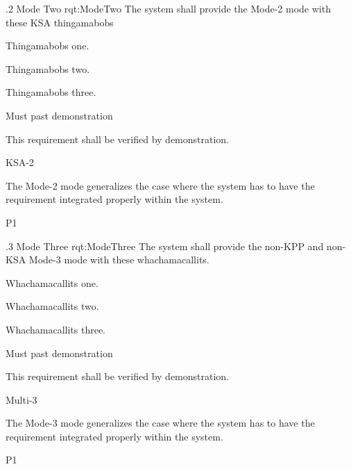 \MULTIRQMTVKSA
{\RqtNumberBase.2}
{Mode Two}
{rqt:ModeTwo}
{The system shall provide the Mode-2 mode with these KSA thingamabobs}
{
	\item Thingamabobs one.
	\item Thingamabobs two.
	\item Thingamabobs three.
}
{
	\item [Phase 1] Must past demonstration
}
{This requirement shall be verified by demonstration.}
{
	\item [\cite{ref__KNEAD_Manual}] KSA-2
}
{
	\item The Mode-2 mode generalizes the case where the system has to have the requirement integrated properly within the system.
}
{P1}


\MULTIRQMTV
{\RqtNumberBase.3}
{Mode Three}
{rqt:ModeThree}
{The system shall provide the non-KPP and non-KSA Mode-3 mode with these whachamacallits.}
{
	\item Whachamacallits one.
	\item Whachamacallits two.
	\item Whachamacallits three.
}
{
	\item [Phase 1] Must past demonstration
}
{This requirement shall be verified by demonstration.}
{
	\item [\cite{ref__KNEAD_Manual}] Multi-3
}
{
	\item The Mode-3 mode generalizes the case where the system has to have the requirement integrated properly within the system.
}
{P1}
